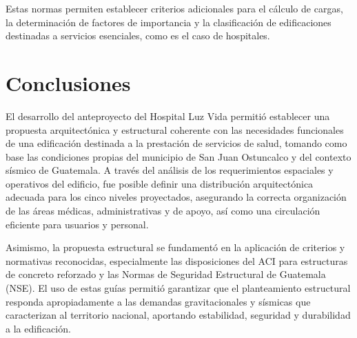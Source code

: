 \documentclass[14pt,letterpaper]{extarticle}
\begin{document}
	Estas normas permiten establecer criterios adicionales para el cálculo de cargas, la determinación de factores de importancia y la clasificación de edificaciones destinadas a servicios esenciales, como es el caso de hospitales.
	
	
	
	
	
	
	
	
	
	
	
	
	
	
	
	
	
	
	
	
		\newpage
	
	\section*{Conclusiones}
	El desarrollo del anteproyecto del Hospital Luz Vida permitió establecer una propuesta arquitectónica y estructural coherente con las necesidades funcionales de una edificación destinada a la prestación de servicios de salud, tomando como base las condiciones propias del municipio de San Juan Ostuncalco y del contexto sísmico de Guatemala. A través del análisis de los requerimientos espaciales y operativos del edificio, fue posible definir una distribución arquitectónica adecuada para los cinco niveles proyectados, asegurando la correcta organización de las áreas médicas, administrativas y de apoyo, así como una circulación eficiente para usuarios y personal.
	
	Asimismo, la propuesta estructural se fundamentó en la aplicación de criterios y normativas reconocidas, especialmente las disposiciones del ACI para estructuras de concreto reforzado y las Normas de Seguridad Estructural de Guatemala (NSE). El uso de estas guías permitió garantizar que el planteamiento estructural responda apropiadamente a las demandas gravitacionales y sísmicas que caracterizan al territorio nacional, aportando estabilidad, seguridad y durabilidad a la edificación.
	

	
	\newpage
	
	\renewcommand{\refname}{Referencias}
	
	
	
\end{document}
